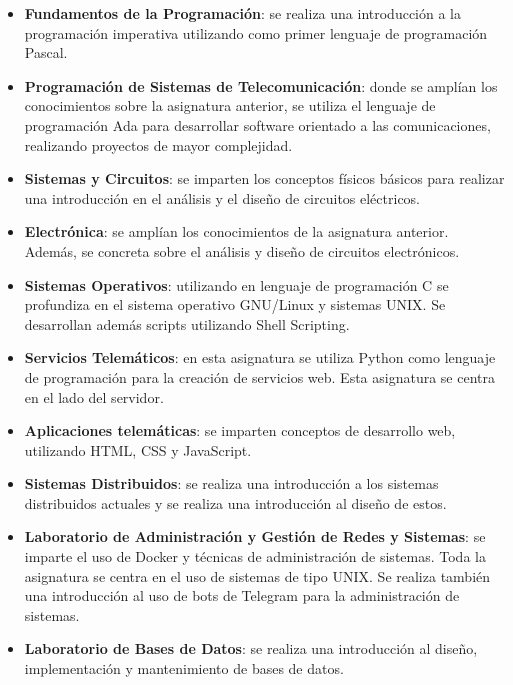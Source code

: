 \documentclass[a4paper, 12pt, oneside]{book}
\begin{document}
\begin{itemize}
\item \textbf{Fundamentos de la Programación}: se realiza una introducción a la programación imperativa utilizando como primer lenguaje de programación Pascal.

\item \textbf{Programación de Sistemas de Telecomunicación}: donde se amplían los conocimientos sobre la asignatura anterior, se utiliza el lenguaje de programación Ada para desarrollar software orientado a las comunicaciones, realizando proyectos de mayor complejidad.

\item \textbf{Sistemas y Circuitos}: se imparten los conceptos físicos básicos para realizar una introducción en el análisis y el diseño de circuitos eléctricos.

\item \textbf{Electrónica}: se amplían los conocimientos de la asignatura anterior. Además, se concreta sobre el análisis y diseño de circuitos electrónicos.

\item \textbf{Sistemas Operativos}: utilizando en lenguaje de programación C se profundiza en el sistema operativo GNU/Linux y sistemas UNIX. Se desarrollan además scripts utilizando Shell Scripting.

\item \textbf{Servicios Telemáticos}: en esta asignatura se utiliza Python como lenguaje de programación para la creación de servicios web. Esta asignatura se centra en el lado del servidor.

\item \textbf{Aplicaciones telemáticas}: se imparten conceptos de desarrollo web, utilizando HTML, CSS y JavaScript.

\item \textbf{Sistemas Distribuidos}: se realiza una introducción a los sistemas distribuidos actuales y se realiza una introducción al diseño de estos.

\item \textbf{Laboratorio de Administración y Gestión de Redes y Sistemas}: se imparte el uso de Docker y técnicas de administración de sistemas. Toda la asignatura se centra en el uso de sistemas de tipo UNIX. Se realiza también una introducción al uso de bots de Telegram para la administración de sistemas.

\item \textbf{Laboratorio de Bases de Datos}: se realiza una introducción al diseño, implementación y mantenimiento de bases de datos.

\end{itemize}
 
\end{document}
